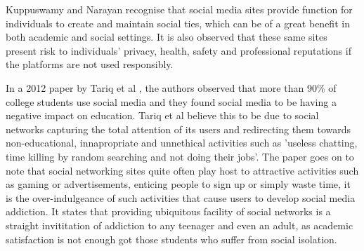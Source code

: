 \documentclass[lettersize,journal]{IEEEtran}
\begin{document}
    Kuppuswamy and Narayan \cite{Kuppuswamy et al 2010} recognise that social
    media sites provide function for individuals to create and maintain social
    ties, which can be of a great benefit in both academic and social settings.
    It is also observed that these same sites present risk to individuals'
    privacy, health, safety and professional reputations if the platforms are
    not used responsibly.

    In a 2012 paper by Tariq et al \cite{Tariq et al 2012}, the authors observed that more than 90\%
    of college students use social media \cite{Ellison et al 2007} and they found social media to be
    having a negative impact on education. Tariq et al believe this to be due to social networks
    capturing the total attention of its users and redirecting them towards non-educational, innapropriate
    and unnethical activities such as 'useless chatting, time killing by random searching and not doing their jobs'. The paper
    goes on to note that social networking sites quite often play host to attractive activities such
    as gaming or advertisements, enticing people to sign up or simply waste time, it is the over-indulgeance
    of such activities that cause users to develop social media addiction. It states that providing ubiquitous
    facility of social networks is a straight invititation of addiction to any teenager and even an adult, as
    academic satisfaction is not enough got those students who suffer from social isolation\cite{Pempek et al 2009}.   
\end{document}
